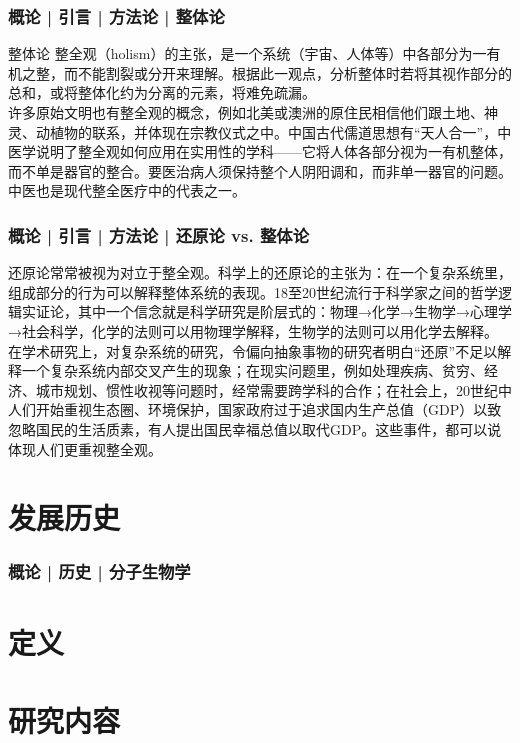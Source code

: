 \begin{frame}[label=current]
  \frametitle{概论 | 引言 | 方法论 | 整体论}
  \begin{block}{整体论}
整全观（holism）的主张，是一个系统（宇宙、人体等）中各部分为一有机之整，而不能割裂或分开来理解。根据此一观点，分析整体时若将其视作部分的总和，或将整体化约为分离的元素，将难免疏漏。\\
\vspace{1em}
许多原始文明也有整全观的概念，例如北美或澳洲的原住民相信他们跟土地、神灵、动植物的联系，并体现在宗教仪式之中。中国古代儒道思想有“天人合一”，中医学说明了整全观如何应用在实用性的学科——它将人体各部分视为一有机整体，而不单是器官的整合。要医治病人须保持整个人阴阳调和，而非单一器官的问题。中医也是现代整全医疗中的代表之一。
  \end{block}
\end{frame}

\begin{frame}[label=current]
  \frametitle{概论 | 引言 | 方法论 | 还原论 vs. 整体论}
还原论常常被视为对立于整全观。科学上的还原论的主张为：在一个复杂系统里，组成部分的行为可以解释整体系统的表现。18至20世纪流行于科学家之间的哲学逻辑实证论，其中一个信念就是科学研究是阶层式的：物理→化学→生物学→心理学→社会科学，化学的法则可以用物理学解释，生物学的法则可以用化学去解释。\\
\vspace{1em}
在学术研究上，对复杂系统的研究，令偏向抽象事物的研究者明白“还原”不足以解释一个复杂系统内部交叉产生的现象；在现实问题里，例如处理疾病、贫穷、经济、城市规划、惯性收视等问题时，经常需要跨学科的合作；在社会上，20世纪中人们开始重视生态圈、环境保护，国家政府过于追求国内生产总值（GDP）以致忽略国民的生活质素，有人提出国民幸福总值以取代GDP。这些事件，都可以说体现人们更重视整全观。
\end{frame}

\section{发展历史}
\begin{frame}
  \frametitle{概论 | 历史 | 分子生物学}
\end{frame}

\section{定义}

\section{研究内容}

